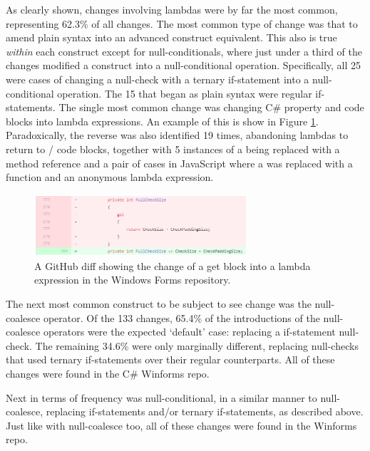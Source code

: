 \documentclass{article}
\begin{document}
        As clearly shown, changes involving lambdas were by far the most common, representing 62.3\% of all changes. The most common type of change was that to amend plain syntax into an advanced construct equivalent. This also is true \emph{within} each construct except for null-conditionals, where just under a third of the changes modified a construct into a null-conditional operation. Specifically, all 25 were cases of changing a null-check with a ternary if-statement into a null-conditional operation. The 15 that began as plain syntax were regular if-statements. The single most common change was changing C\# property  and  code blocks into lambda expressions. An example of this is show in Figure \ref{fig:getSetEx}. Paradoxically, the reverse was also identified 19 times, abandoning lambdas to return to / code blocks, together with 5 instances of a being replaced with a method reference and a pair of cases in JavaScript where a  was replaced with a  function and an anonymous lambda expression.

        \begin{figure}[htbp]
            \centering
            \includegraphics[width=0.7\textwidth]{getSetEx}
            \caption{A GitHub diff showing the change of a get block into a lambda expression in the Windows Forms repository.}
            \label{fig:getSetEx}
        \end{figure}

        The  next most common construct to be subject to see change was the null-coalesce operator. Of the 133 changes, 65.4\% of the introductions of the null-coalesce operators were the expected `default' case: replacing a if-statement null-check. The remaining 34.6\% were only marginally different, replacing null-checks that used ternary if-statements over their regular counterparts. All of these changes were found in the C\# Winforms repo.

        Next in terms of frequency was null-conditional, in a similar manner to null-coalesce, replacing if-statements and/or ternary if-statements, as described above. Just like with null-coalesce too, all of these changes were found in the Winforms repo.
\end{document}
